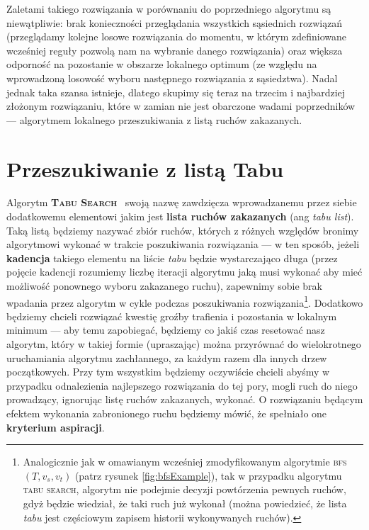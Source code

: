 Zaletami takiego rozwiązania w porównaniu do poprzedniego algorytmu są niewątpliwie: brak konieczności przeglądania wszystkich sąsiednich rozwiązań (przeglądamy kolejne losowe rozwiązania do momentu, w którym zdefiniowane wcześniej reguły pozwolą nam na wybranie danego rozwiązania) oraz większa odporność na pozostanie w obszarze lokalnego optimum (ze względu na wprowadzoną losowość wyboru następnego rozwiązania z sąsiedztwa). Nadal jednak taka szansa istnieje, dlatego skupimy się teraz na trzecim i najbardziej złożonym rozwiązaniu, które w zamian nie jest obarczone wadami poprzedników --- algorytmem lokalnego przeszukiwania z listą ruchów zakazanych.

\section{Przeszukiwanie z listą Tabu}

Algorytm \textsc{\textbf{Tabu Search}}~\cite{TabuSearch} swoją nazwę zawdzięcza wprowadzanemu przez siebie dodatkowemu elementowi jakim jest \textbf{lista ruchów zakazanych} (ang \textit{tabu list}). Taką listą będziemy nazywać zbiór ruchów, których z różnych względów bronimy algorytmowi wykonać w trakcie poszukiwania rozwiązania --- w ten sposób, jeżeli \textbf{kadencja} takiego elementu na liście \textit{tabu} będzie wystarczająco długa (przez pojęcie kadencji rozumiemy liczbę iteracji algorytmu jaką musi wykonać aby mieć możliwość ponownego wyboru zakazanego ruchu), zapewnimy sobie brak wpadania przez algorytm w cykle podczas poszukiwania rozwiązania\footnote{Analogicznie jak w omawianym wcześniej zmodyfikowanym algorytmie \textsc{bfs} $\left( T, v_{s}, v_{t} \right)$ (patrz rysunek \ref{fig:bfsExample}), tak w przypadku algorytmu \textsc{tabu search}, algorytm nie podejmie decyzji powtórzenia pewnych ruchów, gdyż będzie wiedział, że taki ruch już wykonał (można powiedzieć, że lista \textit{tabu} jest częściowym zapisem historii wykonywanych ruchów).}. Dodatkowo będziemy chcieli rozwiązać kwestię groźby trafienia i pozostania w lokalnym minimum --- aby temu zapobiegać, będziemy co jakiś czas resetować nasz algorytm, który w takiej formie (upraszając) można przyrównać do wielokrotnego uruchamiania algorytmu zachłannego, za każdym razem dla innych drzew początkowych. Przy tym wszystkim będziemy oczywiście chcieli abyśmy w przypadku odnalezienia najlepszego rozwiązania do tej pory, mogli ruch do niego prowadzący, ignorując listę ruchów zakazanych, wykonać. O rozwiązaniu będącym efektem wykonania zabronionego ruchu będziemy mówić, że spełniało one \textbf{kryterium aspiracji}.

